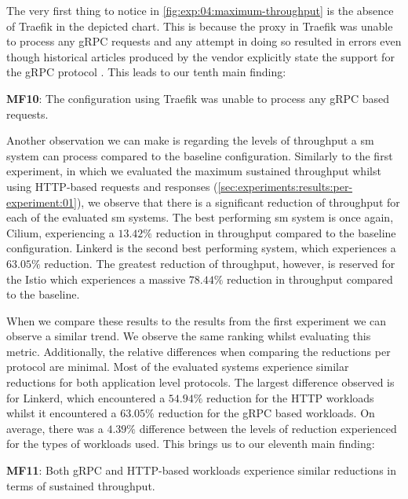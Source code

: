 The very first thing to notice in \cref{fig:exp:04:maximum-throughput} is the absence of Traefik in the depicted chart. This is because the proxy in Traefik was unable to process any gRPC requests and any attempt in doing so resulted in errors even though historical articles produced by the vendor explicitly state the support for the gRPC protocol \cite{maesh-introduction}. This leads to our tenth main finding:

\begin{shaded*}
    \noindent
    \textbf{MF10}:
    The configuration using Traefik was unable to process any gRPC based requests.
\end{shaded*}


Another observation we can make is regarding the levels of throughput a \gls{sm} system can process compared to the baseline configuration. Similarly to the first experiment, in which we evaluated the maximum sustained throughput whilst using HTTP-based requests and responses (\cref{sec:experiments:results:per-experiment:01}), we observe that there is a significant reduction of throughput for each of the evaluated \gls{sm} systems. The best performing \gls{sm} system is once again, Cilium, experiencing a $13.42\%$ reduction in throughput compared to the baseline configuration. Linkerd is the second best performing system, which experiences a $63.05\%$ reduction. The greatest reduction of throughput, however, is reserved for the Istio which experiences a massive $78.44\%$ reduction in throughput compared to the baseline.

When we compare these results to the results from the first experiment we can observe a similar trend. We observe the same ranking whilst evaluating this metric. Additionally, the relative differences when comparing the reductions per protocol are minimal. Most of the evaluated systems experience similar reductions for both application level protocols. The largest difference observed is for Linkerd, which encountered a $54.94\%$ reduction for the HTTP workloads whilst it encountered a $63.05\%$ reduction for the gRPC based workloads. On average, there was a $4.39\%$ difference between the levels of reduction experienced for the types of workloads used. This brings us to our eleventh main finding:

\begin{shaded*}
    \noindent
    \textbf{MF11}:
    Both gRPC and HTTP-based workloads experience similar reductions in terms of sustained throughput.
\end{shaded*}

